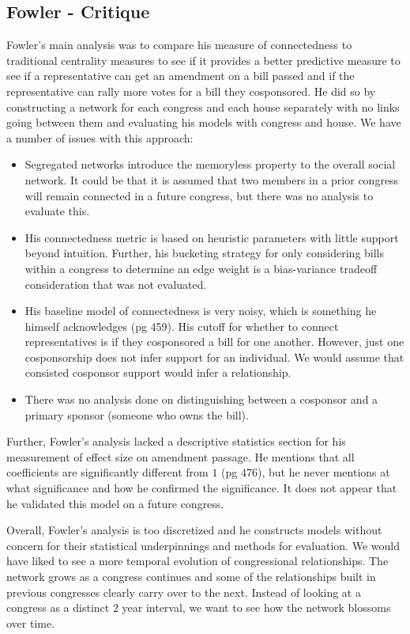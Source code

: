 \subsection{Fowler - Critique}

Fowler's main analysis was to compare his measure of connectedness to 
traditional centrality measures to see if it provides a better predictive 
measure to see if a representative can get an amendment on a bill passed and 
if the representative can rally more votes for a bill they cosponsored. He 
did so by constructing a network for each congress and each house separately 
with no links going between them and evaluating his models with congress and 
house. We have a number of issues with this approach:

\begin{itemize}
	\item Segregated networks introduce the memoryless property to the overall 
	social network. It could be that it is assumed that two members in a 
	prior congress will remain connected in a future congress, but there was no 
	analysis to evaluate this. 
	\item His connectedness metric is based on heuristic parameters with little 
	support beyond intuition. Further, his bucketing strategy for only 
	considering bills within a congress to determine an edge weight is a 
	bias-variance tradeoff consideration that was not evaluated.
	\item His baseline model of connectedness is very noisy, which is something 
	he himself acknowledges (pg 459). His cutoff for whether to connect 
	representatives is if they cosponsored a bill for one another. However, 
	just one cosponsorship does not infer support for an individual. We would 
	assume that consisted cosponsor support would infer a relationship. 
	\item There was no analysis done on distinguishing between a cosponsor and 
	a primary sponsor (someone who owns the bill).
\end{itemize}

Further, Fowler's analysis lacked a descriptive statistics section for his 
measurement of effect size on amendment passage. He mentions that all 
coefficients are significantly different from $1$ (pg 476), but he never 
mentions at what significance and how he confirmed the significance. It does 
not appear that he validated this model on a future congress.

Overall, Fowler's analysis is too discretized and he constructs models without 
concern for their statistical underpinnings and methods for evaluation. We 
would have liked to see a more temporal evolution of congressional 
relationships. The network grows as a congress continues and some of the 
relationships built in previous congresses clearly carry over to the next. 
Instead of looking at a congress as a distinct $2$ year interval, we want to 
see how the network blossoms over time.
